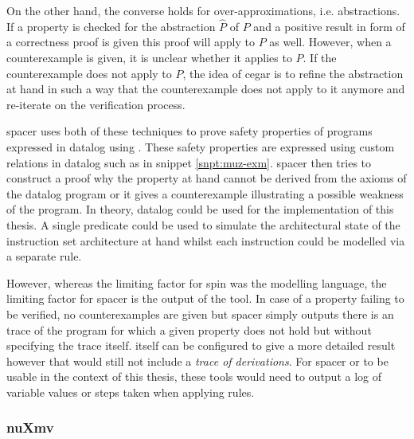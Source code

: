 On the other hand, the converse holds for over-approximations, i.e. abstractions.
If a property is checked for the abstraction $ \hat{P} $ of $ P $ and a positive result in form of a correctness proof is given this proof will apply to $ P $ as well.
However, when a counterexample is given, it is unclear whether it applies to $ P $.
If the counterexample does not apply to $ P $, the idea of \gls{cegar} \cite{Clark00} is to refine the abstraction at hand in such a way that the counterexample does not apply to it anymore and re-iterate on the verification process.

\gls{spacer} uses both of these techniques to prove safety properties of programs expressed in \gls{datalog} using \muZ{}.
These safety properties are expressed using custom relations in \gls{datalog} such as  in snippet \ref{snpt:muz-exm}.
\gls{spacer} then tries to construct a proof why the property at hand cannot be derived from the axioms of the \gls{datalog} program or it gives a counterexample illustrating a possible weakness of the program.
In theory, \gls{datalog} could be used for the implementation of this thesis.
A single predicate could be used to simulate the architectural state of the instruction set architecture at hand whilst each instruction could be modelled via a separate rule.

However, whereas the limiting factor for \gls{spin} was the modelling language, the limiting factor for \gls{spacer} is the output of the tool.
In case of a property failing to be verified, no counterexamples are given but \gls{spacer} simply outputs there is an trace of the program for which a given property does not hold but without specifying the trace itself.
\muZ{} itself can be configured to give a more detailed result however that would still not include a \textit{trace of derivations}.
For \gls{spacer} or \muZ{} to be usable in the context of this thesis, these tools would need to output a log of variable values or steps taken when applying rules.

\subsubsection{nuXmv}

